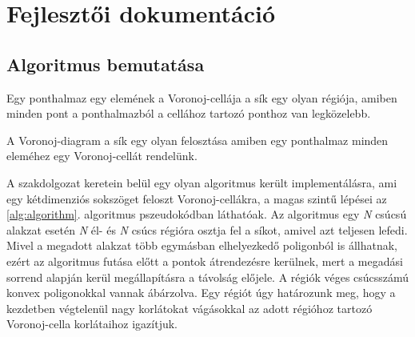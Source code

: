 \chapter{Fejlesztői dokumentáció}
\label{ch:impl}

\section{Algoritmus bemutatása}

\begin{definition}
    Egy ponthalmaz egy elemének a Voronoj-cellája a sík egy olyan régiója, amiben minden pont a ponthalmazból a cellához tartozó ponthoz van legközelebb.
\end{definition}

\begin{definition}
    A Voronoj-diagram a sík egy olyan felosztása amiben egy ponthalmaz minden eleméhez egy Voronoj-cellát rendelünk.
\end{definition}

A szakdolgozat keretein belül egy olyan algoritmus került implementálásra, ami egy kétdimenziós sokszöget feloszt Voronoj-cellákra, a magas szintű lépései az \ref{alg:algorithm}. algoritmus pszeudokódban láthatóak. Az algoritmus egy \textit{N} csúcsú alakzat esetén \textit{N} él- és \textit{N} csúcs régióra osztja fel a síkot, amivel azt teljesen lefedi. Mivel a megadott alakzat több egymásban elhelyezkedő poligonból is állhatnak, ezért az algoritmus futása előtt a pontok átrendezésre kerülnek, mert a megadási sorrend alapján kerül megállapításra a távolság előjele. A régiók véges csúcsszámú konvex poligonokkal vannak ábárzolva. Egy régiót úgy határozunk meg, hogy a kezdetben végtelenül nagy korlátokat vágásokkal az adott régióhoz tartozó Voronoj-cella korlátaihoz igazítjuk.

